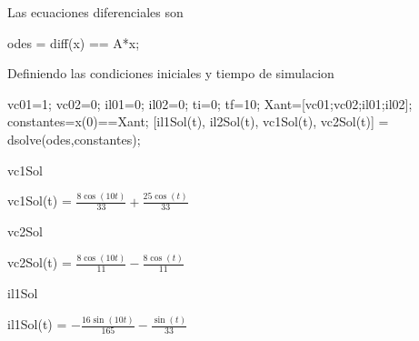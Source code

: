 \documentclass[10pt,a4paper]{article} %
\begin{document}
\begin{par}
	\begin{flushleft}
		Las ecuaciones diferenciales son
	\end{flushleft}
\end{par}

\begin{matlabcode}
	odes = diff(x) == A*x;
\end{matlabcode}

\begin{par}
	\begin{flushleft}
		Definiendo las condiciones iniciales y tiempo de simulacion
	\end{flushleft}
\end{par}

\begin{matlabcode}
	vc01=1;
	vc02=0;
	il01=0;
	il02=0;
	ti=0;
	tf=10;
	Xant=[vc01;vc02;il01;il02];
	constantes=x(0)==Xant;
	[il1Sol(t), il2Sol(t), vc1Sol(t), vc2Sol(t)] = dsolve(odes,constantes);
\end{matlabcode}



\begin{matlabcode}
	vc1Sol
\end{matlabcode}
\begin{matlabsymbolicoutput}
	vc1Sol(t) = 
	$\displaystyle \frac{8 \cos \left(10 t\right)}{33}+\frac{25 \cos \left(t\right)}{33}$
\end{matlabsymbolicoutput}


\begin{matlabcode}
	vc2Sol
\end{matlabcode}
\begin{matlabsymbolicoutput}
	vc2Sol(t) = 
	$\displaystyle \frac{8 \cos \left(10 t\right)}{11}-\frac{8 \cos \left(t\right)}{11}$
\end{matlabsymbolicoutput}


\begin{matlabcode}
	il1Sol
\end{matlabcode}
\begin{matlabsymbolicoutput}
	il1Sol(t) = 
	$\displaystyle -\frac{16 \sin \left(10 t\right)}{165}-\frac{\sin \left(t\right)}{33}$
\end{matlabsymbolicoutput}

\end{document}
